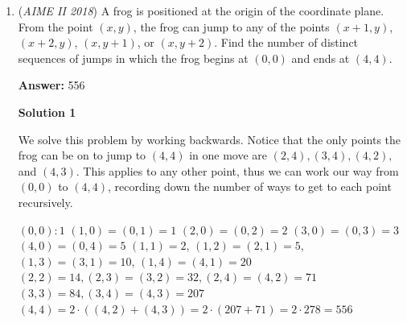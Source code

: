 \begin{enumerate}
Let $T_1$ stand for $AP_1Q_1$, and $T_k = AP_kQ_k$. All triangles $T$ are similar by AA. Let the area of $T_1$ be $x$. The next trapezoid will also have an area of $x$, as given. Therefore, $T_k$ has an area of $kx$. The ratio of the areas is equal to the square of the scale factor for any plane figure and its image. Therefore, $P_k Q_k=P_1 Q_1\cdot \sqrt{k}$, and the same if $Q$ is substituted for $P$ throughout. We want the side $P_k Q_k$ to be rational. Setting up proportions: 
 \[5\sqrt{3} : \sqrt{2450}=35\sqrt{2}\] 
 \[\sqrt{6} : 14\] which shows that $P_1 Q_1=\frac{\sqrt{6}}{14}$. In order for $\sqrt{k} P_1 Q_1$ to be rational, $\sqrt{k}$ must be some rational multiple of $\sqrt{6}$. This is achieved at $\sqrt{k}=\sqrt{6}, 2\sqrt{6}, \ldots, 20\sqrt{6}$. We end there as $21\sqrt{6}=\sqrt{2646}$. There are 20 numbers from 1 to 20, so there are $\boxed{020}$ solutions.

 Solution by a1b2

 



\textbf{Solution 4: I didn't even qualify and I solved this}

We can also use area ratios to get that $P_nQ_n$ is $\sqrt(n)(P_1Q_1)$. So $P_{2450}Q_{2450} = 35 \sqrt(3) = 35\sqrt(2)P_1Q_1$ so $P_1Q_1$(call this $L_1$) is $\sqrt(6)/14$. So We want $L_1\sqrt(n)$ to be rational, or that $\sqrt(n) = j\sqrt(6)$. So $j$ can range from 1 to 20, so we get $\boxed{020}$.

 


	\item (\textit{AIME II 2018}) A frog is positioned at the origin of the coordinate plane. From the point $(x, y)$, the frog can jump to any of the points $(x + 1, y)$, $(x + 2, y)$, $(x, y + 1)$, or $(x, y + 2)$. Find the number of distinct sequences of jumps in which the frog begins at $(0, 0)$ and ends at $(4, 4)$.


 
 \textbf{Answer: }556



\textbf{Solution 1}

We solve this problem by working backwards. Notice that the only points the frog can be on to jump to $(4,4)$ in one move are $(2,4),(3,4),(4,2),$ and $(4,3)$. This applies to any other point, thus we can work our way from $(0,0)$ to $(4,4)$, recording down the number of ways to get to each point recursively. 

 $(0,0): 1$
$(1,0)=(0,1)=1$
$(2,0)=(0, 2)=2$
$(3,0)=(0, 3)=3$
$(4,0)=(0, 4)=5$
$(1,1)=2$, $(1,2)=(2,1)=5$, $(1,3)=(3,1)=10$, $(1,4)=(4,1)= 20$
$(2,2)=14, (2,3)=(3,2)=32, (2,4)=(4,2)=71$
$(3,3)=84, (3,4)=(4,3)=207$
$(4,4)=2\cdot \left( (4,2)+(4,3)\right) = 2\cdot \left( 207+71\right)=2\cdot 278=\boxed{556}$


\end{enumerate}
